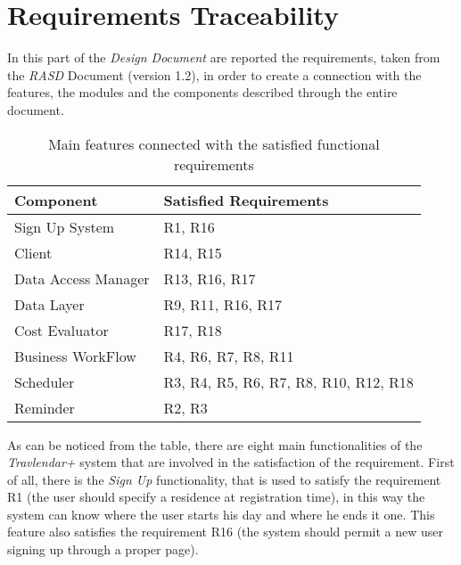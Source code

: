 \chapter{Requirements Traceability}
In this part of the \emph{Design Document} are reported the requirements, taken from the \emph{RASD} Document (version 1.2), in order to create a connection with the features, the modules and the components described through the entire document.

\renewcommand{\arraystretch}{1.5}

\begin{table}[H]
    \centering
    \begin{tabular}{p{4cm} | p{7cm}}
        \large{\textbf{Component}} & \large{\textbf{Satisfied Requirements}} \\
        \hline
        
        Sign Up System              & R1, R16                                   \\
        
        Client                      & R14, R15                                  \\
        
        Data Access Manager         & R13, R16, R17                                  \\
        
        Data Layer                  & R9, R11, R16, R17                         \\
        
        Cost Evaluator              & R17, R18                             \\
        
        Business WorkFlow           & R4, R6, R7, R8, R11                       \\
        
        Scheduler                   & R3, R4, R5, R6, R7, R8, R10, R12, R18     \\
        
        Reminder                    & R2, R3                                    \\
    \end{tabular}
    \caption{Main features connected with the satisfied functional requirements}
\end{table}

As can be noticed from the table, there are eight main functionalities of the \emph{Travlendar+} system that are involved in the satisfaction of the requirement. 
First of all, there is the \emph{Sign Up} functionality, that is used to satisfy the requirement R1 (the user should specify a residence at registration time), in this way the system can know where the user starts his day and where he ends it one. This feature also satisfies the requirement R16 (the system should permit a new user signing up through a proper page).

